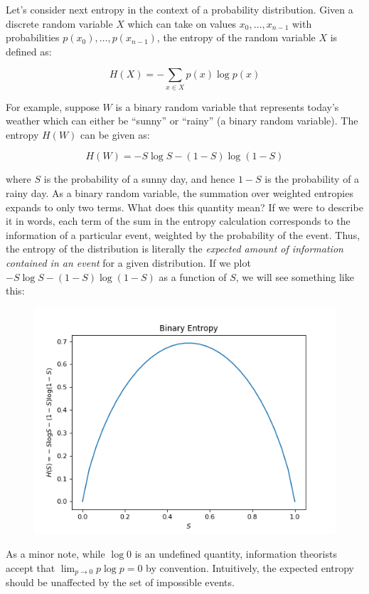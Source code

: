 \documentclass[
]{article}
\begin{document}
Let's consider next entropy in the context of a probability
distribution. Given a discrete random variable \(X\) which can take on
values \(x_0, \dots, x_{n-1}\) with probabilities
\(p(x_0), \dots, p(x_{n-1})\), the entropy of the random variable \(X\)
is defined as:

\[H(X) = -\sum_{x \in X} p(x) \log p(x)\]

For example, suppose \(W\) is a binary random variable that represents
today's weather which can either be ``sunny'' or ``rainy'' (a binary
random variable). The entropy \(H(W)\) can be given as:

\[H(W) = -S\log S - (1 - S) \log (1 - S)\]

where \(S\) is the probability of a sunny day, and hence \(1 - S\) is
the probability of a rainy day. As a binary random variable, the
summation over weighted entropies expands to only two terms. What does
this quantity mean? If we were to describe it in words, each term of the
sum in the entropy calculation corresponds to the information of a
particular event, weighted by the probability of the event. Thus, the
entropy of the distribution is literally the \emph{expected amount of
information contained in an event} for a given distribution. If we plot
\(-S\log S - (1 - S) \log(1 - S)\) as a function of \(S\), we will see
something like this:

\begin{figure}
\centering
\includegraphics{plots/6094492350593652429.png}
\caption{}
\end{figure}

As a minor note, while \(\log 0\) is an undefined quantity, information
theorists accept that \(\lim_{p\rightarrow 0} p\log p = 0\) by
convention. Intuitively, the expected entropy should be unaffected by
the set of impossible events.
\end{document}

